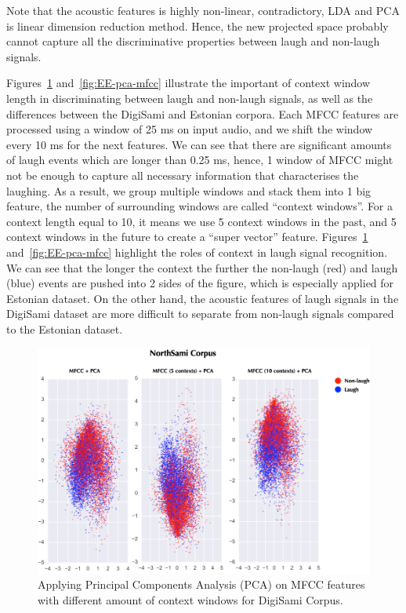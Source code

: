 \documentclass[10pt,journal,compsoc]{IEEEtran}
\begin{document}
Note that the acoustic features is highly non-linear, contradictory, LDA and PCA is linear dimension reduction method. Hence, the new projected space probably cannot capture all the discriminative properties between laugh and non-laugh signals.

Figures~\ref{fig:DS-pca-mfcc} and~\ref{fig:EE-pca-mfcc} illustrate the important of context window length in discriminating between laugh and non-laugh signals, as well as the differences between the DigiSami and Estonian corpora. Each MFCC features are processed using a window of 25 ms on input audio, and we shift the  window every 10 ms for the next features. We can see that there are significant amounts of laugh events which are longer than 0.25 ms, hence, 1 window of MFCC might not be enough to capture all necessary information that characterises the laughing. As a result, we group multiple windows and stack them into 1 big feature, the number of surrounding windows are called ``context windows''. For a context length equal to 10, it means we use 5 context windows in the past, and 5 context windows in the future to create a ``super vector'' feature. Figures~\ref{fig:DS-pca-mfcc} and~\ref{fig:EE-pca-mfcc} highlight the roles of context in laugh signal recognition. We can see that the longer the context the further the non-laugh (red) and laugh (blue) events are pushed into 2 sides of the figure, which is especially applied for Estonian dataset. On the other hand, the acoustic features of laugh signals in the DigiSami dataset are more difficult to separate from non-laugh signals compared to the Estonian dataset.

\begin{figure}[!t]
\centering
\includegraphics[width=1\linewidth]{images/PCA-MFCC-DS.png}
\caption{Applying Principal Components Analysis (PCA) on MFCC features with different amount of context windows for DigiSami Corpus.}
\label{fig:DS-pca-mfcc}
\end{figure}
\end{document}

